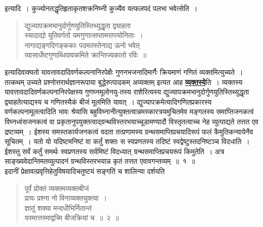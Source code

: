\documentclass[11pt, openany]{book}
\begin{document}
\noindent इत्यादि~। कुज्योनतद्धृतिहृताकृतशक्रनिघ्नी कुज्यैव यत्फलपदं पलभा
भवेत्सेति~।
\begin{quote}
    \q\onehalfspacing
    द्युज्यापक्रमभानुदोर्गुणयुतिस्तिथ्युद्धृता द्व्याहता \\
 स्यादाद्यो युतिवर्गतो यमगुणात्सप्तामराप्त्योनिताः~। \\
 नागाद्यङ्गदिगङ्ककाः पदमतस्तेनाद्य ऊनो भवेत् \\
 व्यासार्धेष्टगुणाब्धिपावकमिते क्रान्तिज्यकातो रविः~॥

\end{quote}
 
इत्यादिवाक्यतो \;यावत्तावदादिवर्णकल्पनानिरपेक्षैः \;गुणनभजनादिमार्गैः \;क्रियमाणं गणितं व्यक्तमित्युच्यते~। तत्कथम् उच्यते प्रश्नोत्तरार्थज्ञानरूपाया
बुद्धेरुत्पादकम् अव्यक्तम् इत्यत आह \hyperref[1]{\textbf{व्यक्तस्ये}}ति~। व्यक्तस्य यावत्तावदादिवर्णकल्पनानिरपेक्षस्य
गुणघ्नमूलोनयु-तस्य राशेरित्यस्य द्युज्यापक्रमभानुदोर्गुणयुतिस्तिथ्युद्धृता
द्व्याहतेत्याद्यस्य च गणितस्यैकं बीजं मूलमिति यावत्~।
द्युज्यापक्रमेत्यादिगणितप्रकारस्य वर्णकल्पनामूलत्वादिति भावः श्रेयांसि
बहुविघ्नानीत्युक्तत्वान्नमस्कारत्रयमुचितमेव मङ्गलस्य समाप्तिजनकत्वं विघ्नध्वंसजनकत्वं वा
प्रकृतानुपयुक्तत्वाद्ग्रन्थविस्तरभयाच्चूडामण्यादौ विस्तृतत्वाच्च नेह
व्युत्पाद्यते तत्तत एव द्रष्टव्यम्~। ईशस्य समस्तकार्यजनकत्वं वदता तत्प्रणामस्य
\newpage
\noindent ग्रन्थसमाप्तिप्रचयादिरूपं फलं कैमुतिकन्यायेनैव सूचितम्~। 
यतो यो यदिष्टमनिष्टं वा कर्तुं शक्तः स स्वप्रणतस्य तदिष्टं
स्वद्वेष्टुस्तदनिष्टञ्च विदधाति~।
ईशस्तु सर्वं कर्तुं समर्थः स्वप्रणतस्य सर्वमिष्टं विदध्यात्
ग्रन्थसमाप्तिप्रचयरूपं किमुतेति~।
अत्र साङ्ख्यवेदान्तिमतव्युत्पादनं ग्रन्थविस्तरभयान्न कृतं
तत्तत एवावगन्तव्यम्~॥~१~॥\\

\vspace{-4mm}
 इदानीं प्रेक्षावत्प्रवृत्तिहेतुविषयादिचतुष्टयं सङ्गतिं च शालिन्या
दर्शयति\textendash 

 \label{2}
\begin{quote}
    \ab
    पूर्वं प्रोक्तं व्यक्तमव्यक्तबीजं \\
 प्रायः प्रश्ना नो विनाव्यक्तयुक्त्या~।\\
 ज्ञातुं शक्या मन्दधीभिर्नितान्तं \\
 यस्मात्तस्माद्वच्मि बीजक्रियां च~॥~२~॥~

\end{quote}
 
\end{document}
